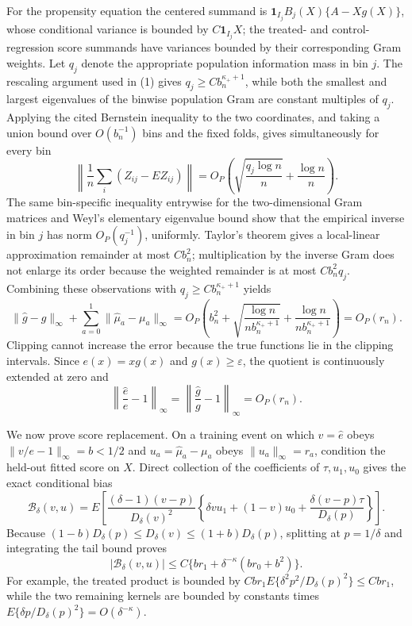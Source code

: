 For the propensity equation the centered summand is \(\mathbf1_{I_j}B_j(X)\{A-Xg(X)\}\), whose conditional variance is bounded by \(C\mathbf1_{I_j}X\); the treated- and control-regression score summands have variances bounded by their corresponding Gram weights.  Let \(q_j\) denote the appropriate population information mass in bin \(j\).  The rescaling argument used in (1) gives \(q_j\geq Cb_n^{\kappa_++1}\), while both the smallest and largest eigenvalues of the binwise population Gram are constant multiples of \(q_j\).  Applying the cited Bernstein inequality to the two coordinates, and taking a union bound over \(O(b_n^{-1})\) bins and the fixed folds, gives simultaneously for every bin
\[
 \left\|\frac1n\sum_i(Z_{ij}-EZ_{ij})\right\|
 =O_P\!\left(\sqrt{\frac{q_j\log n}{n}}+\frac{\log n}{n}\right). \tag{2}
\]
The same bin-specific inequality entrywise for the two-dimensional Gram matrices and Weyl's elementary eigenvalue bound show that the empirical inverse in bin \(j\) has norm \(O_P(q_j^{-1})\), uniformly.  Taylor's theorem gives a local-linear approximation remainder at most \(C b_n^2\); multiplication by the inverse Gram does not enlarge its order because the weighted remainder is at most \(Cb_n^2q_j\).  Combining these observations with \(q_j\geq Cb_n^{\kappa_++1}\) yields
\[
 \|\widehat g-g\|_\infty+\sum_{a=0}^1\|\widehat\mu_a-\mu_a\|_\infty
 =O_P\!\left(b_n^2+\sqrt{\frac{\log n}{n b_n^{\kappa_++1}}}
 +\frac{\log n}{n b_n^{\kappa_++1}}\right)=O_P(r_n). \tag{3}
\]
Clipping cannot increase the error because the true functions lie in the clipping intervals.  Since \(e(x)=xg(x)\) and \(g(x)\geq\varepsilon\), the quotient is continuously extended at zero and
\[
 \left\|\frac{\widehat e}{e}-1\right\|_\infty
 =\left\|\frac{\widehat g}{g}-1\right\|_\infty=O_P(r_n). \tag{4}
\]

We now prove score replacement.  On a training event on which \(v=\widehat e\) obeys \(\|v/e-1\|_\infty=b<1/2\) and \(u_a=\widehat\mu_a-\mu_a\) obeys \(\|u_a\|_\infty=r_a\), condition the held-out fitted score on \(X\).  Direct collection of the coefficients of \(\tau,u_1,u_0\) gives the exact conditional bias
\[
 \mathcal B_\delta(v,u)
 =E\!\left[
 \frac{(\delta-1)(v-p)}{D_\delta(v)^2}
 \left\{\delta vu_1+(1-v)u_0+\frac{\delta(v-p)\tau}{D_\delta(p)}\right\}
 \right]. \tag{5}
\]
Because \((1-b)D_\delta(p)\leq D_\delta(v)\leq(1+b)D_\delta(p)\), splitting at \(p=1/\delta\) and integrating the tail bound proves
\[
 |\mathcal B_\delta(v,u)|
 \leq C\{br_1+\delta^{-\kappa}(br_0+b^2)\}. \tag{6}
\]
For example, the treated product is bounded by \(Cbr_1E\{\delta^2p^2/D_\delta(p)^2\}\leq Cbr_1\), while the two remaining kernels are bounded by constants times \(E\{\delta p/D_\delta(p)^2\}=O(\delta^{-\kappa})\).

